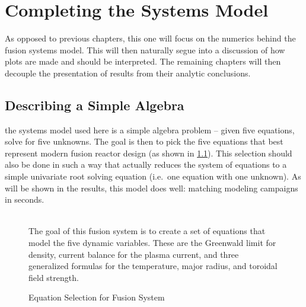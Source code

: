 %
%
%
%
%
%
%
%


\chapter{Completing the Systems Model}

\label{chapter:complete}

As opposed to previous chapters, this one will focus on the numerics behind the fusion systems model.   This will then naturally segue into a discussion of how plots are made and should be interpreted. The remaining chapters will then decouple the presentation of results from their analytic conclusions. 

\section{Describing a Simple Algebra}

 the systems model used here is a simple algebra problem -- given five equations, solve for five unknowns. The goal is then to pick the five equations that best represent modern fusion reactor design (as shown in \cref{fig:equation_breakdown}). This selection should also be done in such a way that actually reduces the system of equations to a simple univariate root solving equation (i.e.\ one equation with one unknown). As will be shown in the results, this model does  well: matching  modeling campaigns in seconds.

\begin{figure}
	\centering
	\begin{adjustbox}{width=0.75\textwidth}
		
	\end{adjustbox}
	\caption{Equation Selection for Fusion System} ~\\
	\small The goal of this fusion system is to create a set of equations that model the five dynamic variables. These are the Greenwald limit for density, current balance for the plasma current, and three generalized formulas for the temperature, major radius, and toroidal field strength.	
	\label{fig:equation_breakdown}
\end{figure}

